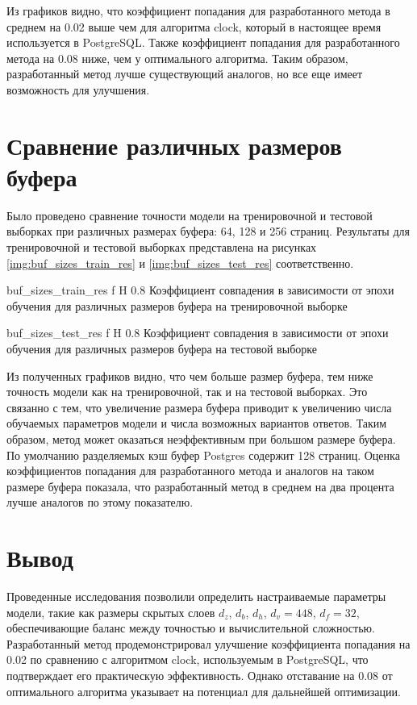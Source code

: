 Из графиков видно, что коэффициент попадания для разработанного метода в среднем на 0.02 выше чем для алгоритма clock, который в настоящее время используется в PostgreSQL.
Также коэффициент попадания для разработанного метода на 0.08 ниже, чем у оптимального алгоритма.
Таким образом, разработанный метод лучше существующий аналогов, но все еще имеет возможность для улучшения.

\section{Сравнение различных размеров буфера}

Было проведено сравнение точности модели на тренировочной и тестовой выборках при различных размерах буфера: 64, 128 и 256 страниц.
Результаты для тренировочной и тестовой выборках представлена на рисунках \ref{img:buf_sizes_train_res} и \ref{img:buf_sizes_test_res} соответственно.

{buf_sizes_train_res} %
{f} %
{H} %
{0.8\textwidth} %
{Коэффициент совпадения в зависимости от эпохи обучения для различных размеров буфера на тренировочной выборке} %

{buf_sizes_test_res} %
{f} %
{H} %
{0.8\textwidth} %
{Коэффициент совпадения в зависимости от эпохи обучения для различных размеров буфера на тестовой выборке} %

Из полученных графиков видно, что чем больше размер буфера, тем ниже точность модели как на тренировочной, так и на тестовой выборках.
Это связанно с тем, что увеличение размера буфера приводит к увеличению числа обучаемых параметров модели и числа возможных вариантов ответов.
Таким образом, метод может оказаться неэффективным при большом размере буфера.
По умолчанию разделяемых кэш буфер Postgres содержит 128 страниц.
Оценка коэффициентов попадания для разработанного метода и аналогов на таком размере буфера показала, что разработанный метод в среднем на два процента лучше аналогов по этому показателю.

\section{Вывод}
Проведенные исследования позволили определить настраиваемые параметры модели, такие как размеры скрытых слоев $d_z$, $d_b$, $d_h$, $d_v = 448$, $d_f = 32$, обеспечивающие баланс между точностью и вычислительной сложностью. 
Разработанный метод продемонстрировал улучшение коэффициента попадания на 0.02 по сравнению с алгоритмом clock, используемым в PostgreSQL, что подтверждает его практическую эффективность. 
Однако отставание на 0.08 от оптимального алгоритма указывает на потенциал для дальнейшей оптимизации.

